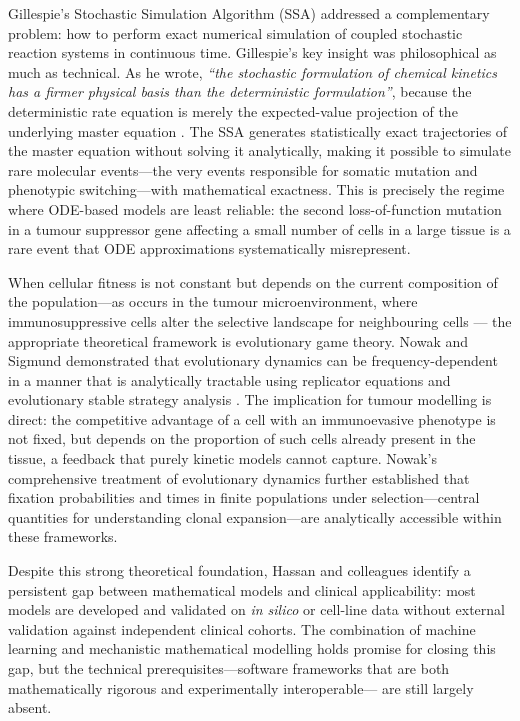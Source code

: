 \documentclass[12pt,a4paper]{article}
\begin{document}
Gillespie's Stochastic Simulation Algorithm (SSA) \cite{gillespie1977} addressed
a complementary problem: how to perform exact numerical simulation of coupled
stochastic reaction systems in continuous time.
Gillespie's key insight was philosophical as much as technical.
As he wrote, \textit{``the stochastic formulation of chemical kinetics has a
firmer physical basis than the deterministic formulation''}, because the deterministic
rate equation is merely the expected-value projection of the underlying master
equation \cite{gillespie1977}.
The SSA generates statistically exact trajectories of the master equation without
solving it analytically, making it possible to simulate rare molecular events---the
very events responsible for somatic mutation and phenotypic switching---with
mathematical exactness.
This is precisely the regime where ODE-based models are least reliable: the second
loss-of-function mutation in a tumour suppressor gene affecting a small number of
cells in a large tissue is a rare event that ODE approximations systematically
misrepresent.

When cellular fitness is not constant but depends on the current composition of
the population---as occurs in the tumour microenvironment, where immunosuppressive
cells alter the selective landscape for neighbouring cells \cite{su2024}---
the appropriate theoretical framework is evolutionary game theory.
Nowak and Sigmund demonstrated that evolutionary dynamics can be frequency-dependent
in a manner that is analytically tractable using replicator equations and evolutionary
stable strategy analysis \cite{nowak2004}.
The implication for tumour modelling is direct: the competitive advantage of a cell
with an immunoevasive phenotype is not fixed, but depends on the proportion of such
cells already present in the tissue, a feedback that purely kinetic models cannot
capture.
Nowak's comprehensive treatment of evolutionary dynamics \cite{nowak2006book}
further established that fixation probabilities and times in finite populations
under selection---central quantities for understanding clonal expansion---are
analytically accessible within these frameworks.

Despite this strong theoretical foundation, Hassan and colleagues \cite{hassan2024}
identify a persistent gap between mathematical models and clinical applicability:
most models are developed and validated on \emph{in silico} or cell-line data
without external validation against independent clinical cohorts.
The combination of machine learning and mechanistic mathematical modelling holds
promise for closing this gap, but the technical prerequisites---software
frameworks that are both mathematically rigorous and experimentally interoperable---
are still largely absent.
\end{document}
